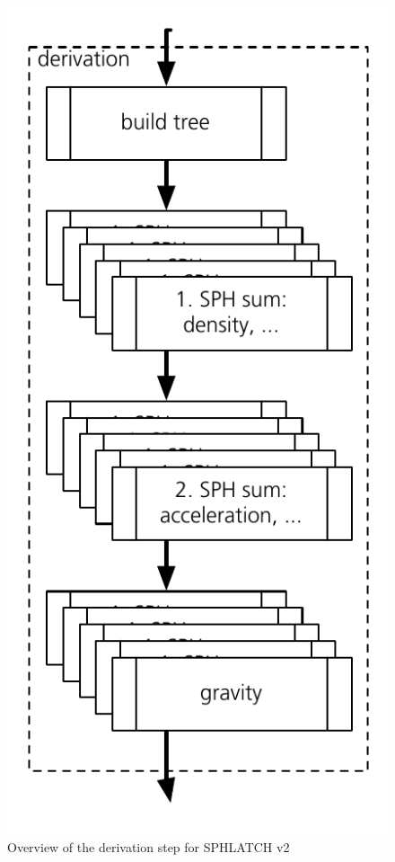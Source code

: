 \begin{figure}[htbp]
\begin{center}
\includegraphics[scale=0.6]{22algo_sphlatch02.pdf}
\caption{Overview of the derivation step for SPHLATCH v2}
\label{ch02_fig22}
\end{center}
\end{figure}

